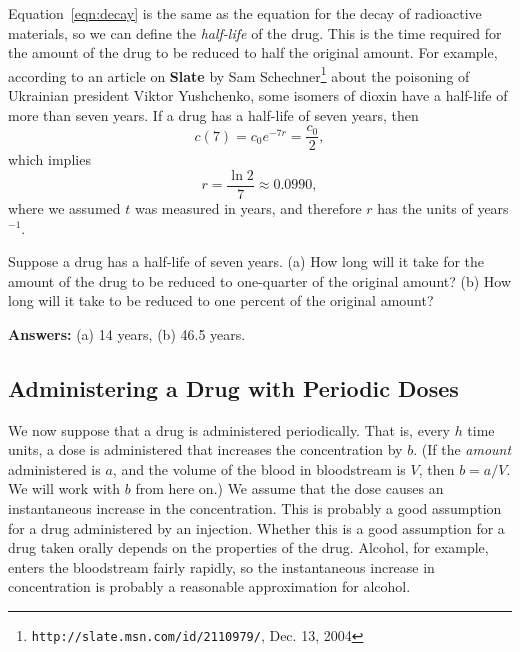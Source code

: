 Equation~\eqref{eqn:decay}
is the same as the equation for the decay of
radioactive materials, so we can define the
\emph{half-life} of the drug. This is the time
required for the amount of the drug to be reduced
to half the original amount.
For example, according to an article on
\textbf{Slate} by Sam Schechner\footnote{\texttt{http://slate.msn.com/id/2110979/}, Dec. 13, 2004}
about the poisoning of Ukrainian president
Viktor Yushchenko, some isomers of 
dioxin have a half-life of more than seven years.
If a drug has a half-life of seven years, then
\begin{equation}
   c(7) = c_0e^{-7r} = \frac{c_0}{2},
\end{equation}
which implies
\begin{equation}
   r = \frac{\ln 2}{7} \approx 0.0990,
\end{equation}
where we assumed $t$ was measured in years, and therefore
$r$ has the units of years$^{-1}$.
\begin{question}
Suppose a drug has a half-life of seven years.
(a) How long will it take for the amount of the drug to
be reduced to one-quarter of the original amount?
(b) How long will it take to be reduced to one percent of the 
original amount?

\hfill \textbf{Answers:} (a) 14 years, (b) 46.5 years.
\end{question}

\subsection*{Administering a Drug with Periodic Doses}
We now suppose that a drug is administered periodically.
That is, every $h$ time units, a dose is administered that
increases the concentration by $b$.
(If the \emph{amount} administered is $a$, and the volume
of the blood in bloodstream is $V$, then $b=a/V$.
We will work with $b$ from here on.)
We assume that the dose causes an instantaneous increase
in the concentration.  This is probably a
good assumption for a drug administered by an injection.
Whether this is a good assumption for a drug taken
orally depends on the properties of the drug.
Alcohol, for example, enters the bloodstream fairly
rapidly, so the instantaneous increase in concentration
is probably a reasonable approximation for alcohol.

